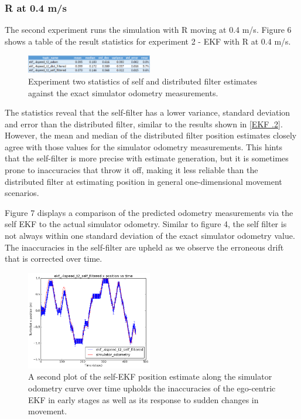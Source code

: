 \documentclass[conference]{IEEEtran} \usepackage[T1]{fontenc} \usepackage[backend=biber, style=ieee]{biblatex}
\begin{document}
\subsubsection{R at 0.4 m/s} \label{EKF .4}
The second experiment runs the simulation with R moving at 0.4 m/s. Figure 6 shows a table of the result statistics for 
experiment 2 - EKF with R at 0.4 m/s. 

\begin{figure}[!ht]
\label{pic6} 
\centering 
\includegraphics[width=0.49\textwidth]{ekf_4_table}
\caption{Experiment two statistics of self and distributed filter estimates against the exact simulator odometry measurements.} 
\end{figure}

The statistics reveal that the self-filter has a lower variance, standard deviation and error than the distributed 
filter, similar to the results shown in \ref{EKF .2}. However, the mean and median of the distributed filter position estimates closely agree with 
those values for the simulator odometry measurements. This hints that the self-filter is more precise with estimate generation, but it is 
sometimes prone to inaccuracies that throw it off, making it less reliable than the distributed filter at estimating position in general 
one-dimensional movement scenarios.

Figure 7 displays a comparison of the predicted odometry measurements via the self EKF to the actual simulator 
odometry. Similar to figure 4, the self filter is not always within one standard deviation of the exact simulator 
odometry value. The inaccuracies in the self-filter are upheld as we observe the erroneous drift that is corrected over time.

\begin{figure}
\centering 
\includegraphics[width=0.49\textwidth]{ekf_4speed_t2_self_filtered_pos_err_graph}
\caption {A second plot of the self-EKF position estimate along the simulator odometry curve over time 
upholds the inaccuracies of the ego-centric EKF in early stages as well as its response to sudden changes 
in movement.}
\label{pic7} 
\end{figure}
\end{document}
